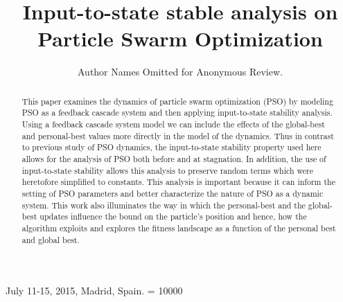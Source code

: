 \documentclass{sig-alternate}
\begin{document}
	
 {July 11-15, 2015, Madrid, Spain.}
\widowpenalty = 10000

\title{Input-to-state stable analysis on Particle Swarm Optimization}


\author{
Author Names Omitted for Anonymous Review. 
}

\maketitle

\begin{abstract}
This paper examines the dynamics of particle swarm optimization (PSO) by modeling PSO as a feedback cascade system and then applying input-to-state stability analysis.
Using a feedback cascade system model we can include the effects of the global-best and personal-best values more directly in the model of the dynamics.
Thus in contrast to previous study of PSO dynamics, the input-to-state stability property used here allows for the analysis of PSO both before and at stagnation.
In addition, the use of input-to-state stability allows this analysis to preserve random terms which were heretofore simplified to constants.
This analysis is important because it can inform the setting of PSO parameters and better characterize the nature of PSO as a dynamic system.
This work also illuminates the way in which the personal-best and the global-best updates influence the bound on the particle's position and hence, how the algorithm exploits and explores the fitness landscape as a function of the personal best and global best.
\end{abstract}
\end{document}
